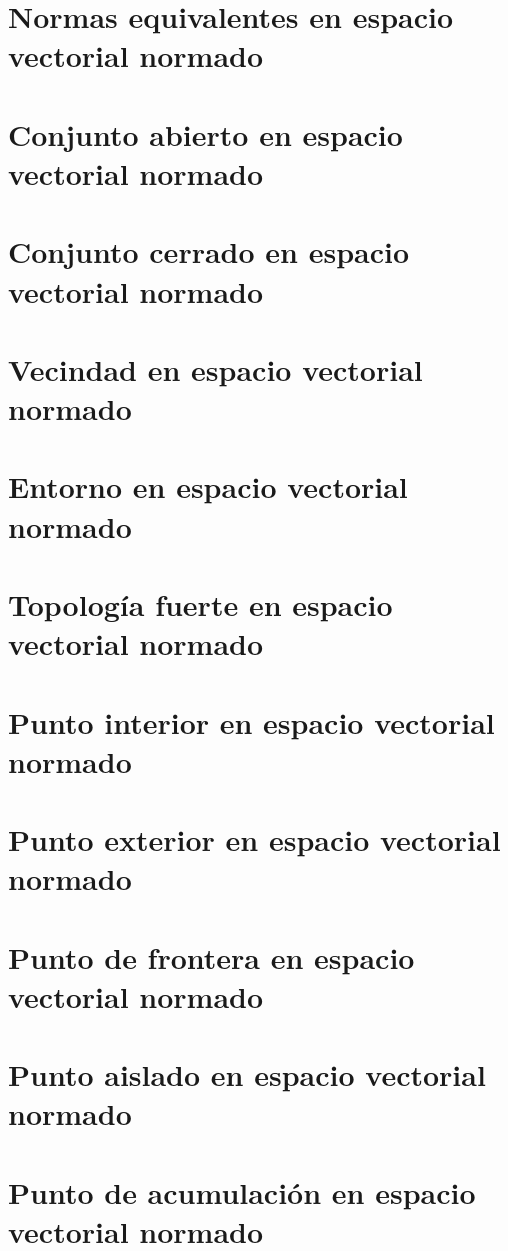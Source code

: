 \section{Normas equivalentes en espacio vectorial normado}

\section{Conjunto abierto en espacio vectorial normado}

\section{Conjunto cerrado en espacio vectorial normado}

\section{Vecindad en espacio vectorial normado}

\section{Entorno en espacio vectorial normado}

\section{Topología fuerte en espacio vectorial normado}

\section{Punto interior en espacio vectorial normado}

\section{Punto exterior en espacio vectorial normado}

\section{Punto de frontera en espacio vectorial normado}

\section{Punto aislado en espacio vectorial normado}

\section{Punto de acumulación en espacio vectorial normado}

